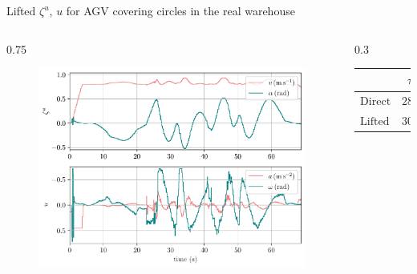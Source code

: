 \documentclass[10pt,aspectratio=1610]{beamer} %
\begin{document}
\begin{frame}{Lifted $\zeta^{u}$, $u$ for AGV covering circles in the real warehouse}
	\begin{columns}[onlytextwidth]
		\begin{column}{0.75\textwidth}
	\begin{figure}[h!tbp]
		\includegraphics[scale=0.65]{figures/u_time}
		\end{figure}
	\end{column}
	\begin{column}{0.3\textwidth}
		\begin{table}[h!tbp]
			\small
			\begin{center}
				\begin{tabular}{lccccl}\toprule
					& $\tau_{\mathrm{rti,\,avg}}$\\
					\midrule
					$\mathrm{Direct}$& $28.99\,\mathrm{ms}$\\
					$\mathrm{Lifted}$& $30.99\,\mathrm{ms}$\\
					\bottomrule
				\end{tabular}
			\end{center}
		\end{table}


\end{column}
\end{columns}
\end{frame}
\end{document}
